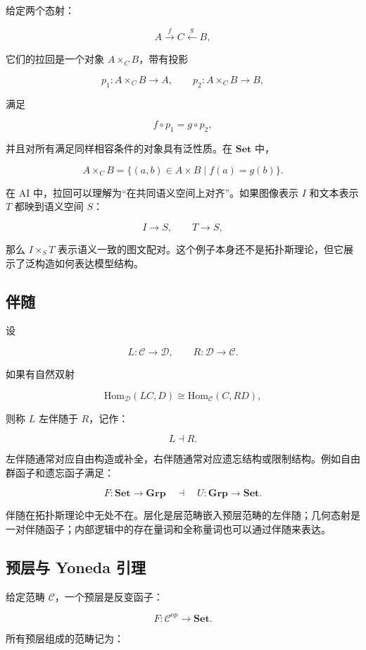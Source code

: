 \documentclass[UTF8,11pt,fontset=none]{ctexart}
\begin{document}
给定两个态射：


\[
A\xrightarrow{f}C\xleftarrow{g}B,
\]

它们的拉回是一个对象 \(A\times_C B\)，带有投影


\[
p_1:A\times_C B\to A,\qquad p_2:A\times_C B\to B,
\]

满足


\[
f\circ p_1=g\circ p_2,
\]

并且对所有满足同样相容条件的对象具有泛性质。在 \(\mathbf{Set}\) 中，


\[
A\times_C B
=\{(a,b)\in A\times B\mid f(a)=g(b)\}.
\]

在 AI 中，拉回可以理解为“在共同语义空间上对齐”。如果图像表示 \(I\) 和文本表示 \(T\) 都映到语义空间 \(S\)：


\[
I\to S,\qquad T\to S,
\]

那么 \(I\times_S T\) 表示语义一致的图文配对。这个例子本身还不是拓扑斯理论，但它展示了泛构造如何表达模型结构。


\subsection{伴随}

设


\[
L:\mathcal{C}\to\mathcal{D},
\qquad
R:\mathcal{D}\to\mathcal{C}.
\]

如果有自然双射


\[
\mathrm{Hom}_{\mathcal{D}}(LC,D)
\cong
\mathrm{Hom}_{\mathcal{C}}(C,RD),
\]

则称 \(L\) 左伴随于 \(R\)，记作：


\[
L\dashv R.
\]

左伴随通常对应自由构造或补全，右伴随通常对应遗忘结构或限制结构。例如自由群函子和遗忘函子满足：


\[
F:\mathbf{Set}\to\mathbf{Grp}
\quad\dashv\quad
U:\mathbf{Grp}\to\mathbf{Set}.
\]

伴随在拓扑斯理论中无处不在。层化是层范畴嵌入预层范畴的左伴随；几何态射是一对伴随函子；内部逻辑中的存在量词和全称量词也可以通过伴随来表达。


\subsection{预层与 Yoneda 引理}

给定范畴 \(\mathcal{C}\)，一个预层是反变函子：


\[
F:\mathcal{C}^{op}\to\mathbf{Set}.
\]

所有预层组成的范畴记为：
\end{document}
